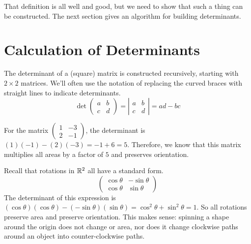 \documentclass[fleqn,letterpaper]{report}
\begin{document}
That definition is all well and good, but we need to show 
that such a thing can be constructed. The next section
gives an algorithm for building determinants.

\section{Calculation of Determinants}
\label{calculation-of-determinants}

The determinant of a (square) matrix is constructed
recursively, starting with $2 \times 2$ matrices. We'll often
use the notation of replacing the curved braces 
with straight lines to indicate determinants. 
\begin{equation*}
\det \left( \begin{matrix} a & b \\ c & d \end{matrix} \right)
= 
\left| \begin{matrix} a & b \\ c & d \end{matrix} \right| =
ad-bc
\end{equation*}

\begin{example}
For the matrix $\left( \begin{matrix} 1 & -3 \\ 2 & -1
\end{matrix} \right)$, the determinant is $(1)(-1) - (2)(-3) =
-1 + 6 = 5$. Therefore, we know that this matrix multiplies
all areas by a factor of $5$ and preserves orientation.
\end{example}

\begin{example}
Recall that rotations in $\mathbb{R}^2$ all have a standard form.
\begin{equation*}
\left( \begin{matrix} 
\cos \theta & - \sin \theta \\ \cos \theta & \sin \theta
\end{matrix} \right) 
\end{equation*}
The determinant of this expression is $(\cos \theta)(\cos
\theta) - (-\sin \theta)(\sin \theta) = \cos^2 \theta + \sin^2
\theta = 1$. So all rotations preserve area and preserve
orientation. This makes sense: spinning a shape around the
origin does not change or area, nor does it change clockwise
paths around an object into counter-clockwise paths. 
\end{example}
\end{document}
